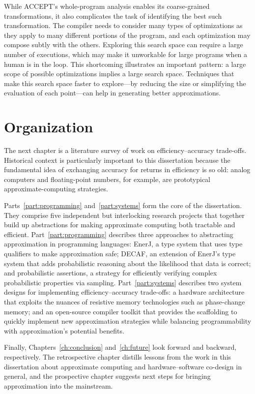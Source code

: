 While ACCEPT's whole-program analysis enables its coarse-grained
transformations, it also complicates the task of identifying the best such
transformation. The compiler needs to consider many types of optimizations as
they apply to many different portions of the program, and each optimization
may compose subtly with the others. Exploring this search space can require
a large number of executions, which may make it unworkable for large programs
when a human is in the loop. This shortcoming illustrates an important
pattern: a large scope of possible optimizations implies a large search space.
Techniques that make this search space faster to explore---by reducing the
size or simplifying the evaluation of each point---can help in generating
better approximations.


\section{Organization}

The next chapter is a literature survey of work on efficiency--accuracy
trade-offs.
Historical context is particularly important to this dissertation because the
fundamental idea of exchanging accuracy for returns in efficiency is so old:
analog computers and floating-point numbers, for example, are prototypical
approximate-computing strategies.

Parts~\ref{part:programming} and~\ref{part:systems} form the core of the
dissertation.
They comprise five independent but interlocking research projects that
together build up abstractions for making approximate computing both tractable
and efficient.
%
Part~\ref{part:programming} describes three approaches to abstracting
approximation in programming languages:
EnerJ, a type system that uses type qualifiers to make approximation safe;
DECAF, an extension of EnerJ's type system that adds probabilistic reasoning
about the likelihood that data is correct;
and probabilistic assertions, a strategy for efficiently verifying complex
probabilistic properties via sampling.
%
Part~\ref{part:systems} describes two system designs for implementing
efficiency--accuracy trade-offs:
a hardware architecture that exploits the nuances of resistive memory
technologies such as phase-change memory;
and an open-source compiler toolkit that provides the scaffolding to quickly
implement new approximation strategies while balancing programmability with
approximation's potential benefits.

Finally, Chapters~\ref{ch:conclusion} and~\ref{ch:future} look forward and
backward, respectively.
The retrospective chapter distills lessons from the work in this dissertation
about approximate computing and hardware--software co-design in general, and
the prospective chapter suggests next steps for bringing approximation into
the mainstream.

